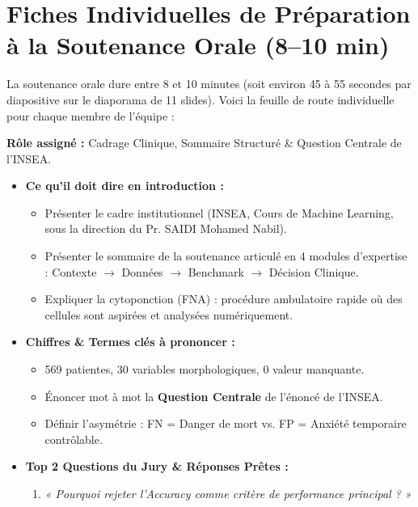 \documentclass[10pt,a4paper]{article}
\begin{document}
\section{Fiches Individuelles de Préparation à la Soutenance Orale (8--10 min)}

\noindent
La soutenance orale dure entre 8 et 10 minutes (soit environ 45 à 55 secondes par diapositive sur le diaporama de 11 slides). Voici la feuille de route individuelle pour chaque membre de l'équipe :

\begin{tcolorbox}[memberbox, title={1. Abdellah LAASSRIA (Master M2SI) -- Slides 1, 2 et 3 (~2 min)}]
\textbf{Rôle assigné :} Cadrage Clinique, Sommaire Structuré \& Question Centrale de l'INSEA.
\begin{itemize}[leftmargin=0.5cm, itemsep=2pt]
	\item \textbf{Ce qu'il doit dire en introduction :}
	\begin{itemize}
		\item Présenter le cadre institutionnel (INSEA, Cours de Machine Learning, sous la direction du Pr. SAIDI Mohamed Nabil).
		\item Présenter le sommaire de la soutenance articulé en 4 modules d'expertise : Contexte $\rightarrow$ Données $\rightarrow$ Benchmark $\rightarrow$ Décision Clinique.
		\item Expliquer la cytoponction (FNA) : procédure ambulatoire rapide où des cellules sont aspirées et analysées numériquement.
	\end{itemize}
	\item \textbf{Chiffres \& Termes clés à prononcer :}
	\begin{itemize}
		\item 569 patientes, 30 variables morphologiques, 0 valeur manquante.
		\item Énoncer mot à mot la \textbf{Question Centrale} de l'énoncé de l'INSEA.
		\item Définir l'asymétrie : FN = Danger de mort vs. FP = Anxiété temporaire contrôlable.
	\end{itemize}
	\item \textbf{Top 2 Questions du Jury \& Réponses Prêtes :}
	\begin{enumerate}
		\item \textit{« Pourquoi rejeter l'Accuracy comme critère de performance principal ? »}  

\end{enumerate}
\end{itemize}
\end{tcolorbox}
\end{document}
